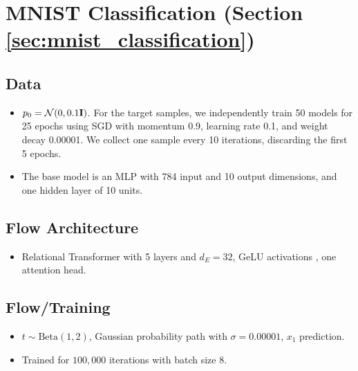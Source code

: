 \section*{MNIST Classification (Section \ref{sec:mnist_classification})}

\subsection*{Data}

\begin{itemize}
    \item $p_0 = \mathcal{N}(0, 0.1 \mathbf{I})$. For the target samples, we independently train 50 models for 25 epochs using SGD with momentum 0.9, learning rate 0.1, and weight decay 0.00001. We collect one sample every 10 iterations, discarding the first 5 epochs. 
    \item The base model is an MLP with 784 input and 10 output dimensions, and one hidden layer of 10 units. 
\end{itemize}

\subsection*{Flow Architecture}
\begin{itemize}
    \item Relational Transformer \citep{diaoRelationalAttentionGeneralizing2023,kofinasGraphNeuralNetworks2024} with 5 layers and $d_E = 32$, GeLU activations \citep{hendrycksGaussianErrorLinear2023a}, one attention head. 
\end{itemize}

\subsection*{Flow/Training}
\begin{itemize}
    \item $t \sim \text{Beta}(1, 2)$, Gaussian probability path with $\sigma = 0.00001$, $x_1$ prediction.
    \item Trained for $100,000$ iterations with batch size 8. 
\end{itemize}


